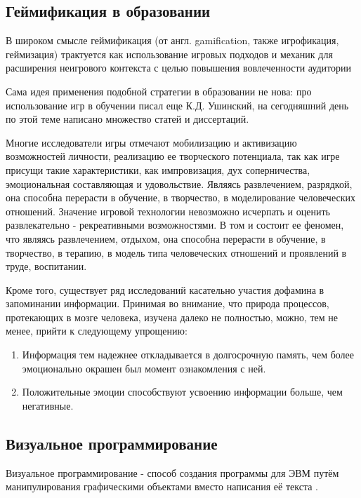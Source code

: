 
\subsection{Геймификация в образовании}

В широком смысле геймификация (от англ. gamification, также игрофикация, геймизация) трактуется как использование игровых подходов и механик для расширения неигрового контекста с целью повышения вовлеченности аудитории \cite{gamification}

Сама идея применения подобной стратегии в образовании не нова: про использование игр в обучении писал еще К.Д. Ушинский, на сегодняшний день по этой теме написано множество статей и диссертаций.

Многие исследователи игры отмечают мобилизацию и активизацию возможностей личности, реализацию ее творческого потенциала, так как игре присущи такие характеристики, как импровизация, дух соперничества, эмоциональная составляющая и удовольствие. Являясь развлечением, разрядкой, она способна перерасти в обучение, в творчество, в моделирование человеческих отношений. Значение игровой технологии невозможно исчерпать и оценить развлекательно - рекреативными возможностями. В том и состоит ее феномен, что являясь развлечением, отдыхом, она способна перерасти в обучение, в творчество, в терапию, в модель типа человеческих отношений и проявлений в труде, воспитании. \cite{gamification-ed}

Кроме того, существует ряд исследований \cite{d1, d2} касательно участия дофамина в запоминании информации. Принимая во внимание, что природа процессов, протекающих в мозге человека, изучена далеко не полностью, можно, тем не менее, прийти к следующему упрощению: 

\begin{enumerate}
\item Информация тем надежнее откладывается в долгосрочную память, чем более эмоционально окрашен был момент ознакомления с ней.
\item Положительные эмоции способствуют усвоению информации больше, чем негативные.
\end{enumerate}

\subsection{Визуальное программирование}

Визуальное программирование - способ создания программы для ЭВМ путём манипулирования графическими объектами вместо написания её текста \cite{VPL}.

